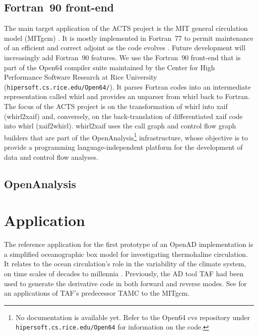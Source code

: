 \documentclass[acmtocl,acmnow]{acmtrans2m}
\begin{document}
\subsection{Fortran~90 front-end} 
The main target application of the ACTS project is the MIT general circulation
model (MITgcm) \cite{mars-eta:97b,mars-eta:97a}. 
It is mostly implemented in Fortran~77 to permit maintenance of an efficient
and correct adjoint as the code evolves \cite{HHG02}. Future development will
increasingly add Fortran~90 features. We use the Fortran~90 
front-end that is part of the Open64 compiler suite 
maintained by the Center for High Performance Software
Research at Rice University 
({\tt hipersoft.cs.rice.edu/Open64/}). It parses
Fortran codes into an intermediate representation called whirl and
provides an unparser from whirl back to Fortran. 
The focus of the ACTS project is on the
transformation of whirl into xaif (whirl2xaif) and, conversely, on the
back-translation of differentiated xaif code into whirl (xaif2whirl). 
whirl2xaif uses the call graph and control flow graph builders that are part 
of the OpenAnalysis\footnote{No documentation is available yet. 
Refer to the Open64 cvs repository under 
{\tt hipersoft.cs.rice.edu/Open64} for information on the code.} 
infrastructure, whose objective is to provide a programming
language-independent platform for the development of data and control flow 
analyses. 
\subsection{OpenAnalysis} 

\section{Application}

The reference application for the first prototype of an OpenAD implementation
is a simplified oceanographic box model for investigating
thermohaline circulation. It relates to the
ocean circulation's role in the variability of the climate system,
on time scales of decades to millennia \cite{tzi-ioa:02}.
Previously, the AD tool TAF \cite{GiKa02} 
had been used to generate the derivative
code in both forward and reverse modes.
See \cite{maro-eta:99} for an applications of
TAF's predecessor TAMC to the MITgcm.
\end{document}
